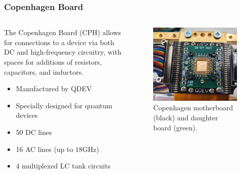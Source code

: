 \documentclass{beamer}
\begin{document}
\begin{frame}
    \frametitle{Copenhagen Board}

    \begin{columns}
        \begin{column}{0.5\textwidth}
            The Copenhagen Board (CPH) allows for connections to a device via both DC and high-frequency circuitry, with spaces for additions of resistors, capacitors, and inductors.

            \begin{itemize}
                \item Manufactured by QDEV
                \item Specially designed for quantum devices
                \item 50 DC lines
                \item 16 AC lines (up to $18 \si{\giga\hertz}$)
                \item 4 multiplexed LC tank circuits
            \end{itemize}



        \end{column}
        \begin{column}{0.5\textwidth}
            \begin{figure}
                \includegraphics[width=\textwidth]{cphboard.jpg}
                \caption{Copenhagen motherboard (black) and daughter board (green).}
                \label{fig:cphboard}
            \end{figure}
        \end{column}
    \end{columns}
\end{frame}
\end{document}
